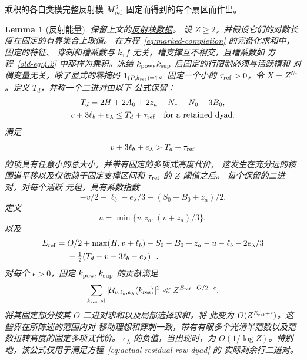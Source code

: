 \documentclass[11pt,a4paper]{article}
\numberwithin{equation}{section}
\numberwithin{figure}{section}
\newtheorem{lemma}[theorem]{Lemma}
\theoremstyle{definition}
\theoremstyle{remark}
\begin{document}
乘积的各自类模完整反射模 \(M_{\rm ref}^2\) 固定而得到的每个扇区而作出。\begin{lemma}[反射能量]\label{lem:reflected-energy}
保留上文的\hyperref[par:reflected-energy-data]{反射块数据}。
设 \(Z\ge2\)，并假设它们的对数长度在固定的有界集合上取值。
在方程~\eqref{eq:marked-completion} 的完备化求和中，固定的特征、
穿刺和槽系数与 \(k,f\) 无关，槽支撑互不相交，且槽系数如
方程~\eqref{old-eq:4.2} 中那样为乘积。冻结
\(k_{\rm pow},k_{\rm sup}\) 后固定的行限制必须与活跃槽和
对偶变量无关，除了显式的零掩码
\(1_{(P,k_{\rm res})=1}\)。固定一个小的 \(\tau_{\rm ref}>0\)，令
\(X=Z^{N_*}\)。定义 \(T_d\)，并称一个二进对由以下
公式保留：
\begin{equation}\label{old-eq:4.4}
 \begin{gathered}
 T_d=2H+2A_0+2z_a-N_*-N_0-3B_0,\\
 v+3\ell_b+e_\lambda\le T_d+\tau_{\rm ref}
 \quad\text{for a retained dyad}.
 \end{gathered}
\end{equation}
满足
\[
 v+3\ell_b+e_\lambda>T_d+\tau_{\rm ref}
\]
的项具有任意小的总大小，并带有固定的多项式高度代价，
这发生在充分远的核围道平移以及仅依赖于固定支撑区间和 \(\tau_{\rm ref}\) 的
\(Z\) 阈值之后。
每个保留的二进对，对每个活跃
元组，具有系数指数
\begin{equation}\label{old-eq:4.5}
 -v/2-\ell_b-e_\lambda/3-(S_0+B_0+z_a)/2.
\end{equation}
定义
\begin{equation}\label{old-eq:4.7}
 u=\min\{v,z_a,(v+z_a)/3\},
\end{equation}
以及
\begin{equation}\label{old-eq:4.6}
 \begin{split}
 E_{\rm ref}={}&O/2+\max(H,v+\ell_b)-S_0-B_0+z_a-u-\ell_b
                     -2e_\lambda/3\\
 &-\tfrac12(T_d-v-3\ell_b-e_\lambda)_+.
 \end{split}
\end{equation}
对每个 \(\epsilon>0\)，固定
\(k_{\rm pow},k_{\rm sup}\) 的贡献满足
\[
 \sum_{k_{\rm res}\ {\rm sf}}
       |\mathcal U_{v,\ell_b,e_\lambda}(k_{\rm res})|^2
 \ll Z^{E_{\rm ref}-O/2+\epsilon}.
\]
将其固定部分按其 \(O\)-二进对求和以及局部选择求和，将
此变为 \(O(Z^{E_{\rm ref}+\epsilon})\)。这些界在所陈述的范围内对
移动理想和穿刺一致，带有有限多个光滑半范数以及范数扭转高度的固定多项式代价。
\(e_\lambda\) 的负值，当出现时，为
\(O(1/\log Z)\)。特别地，该公式仅用于满足方程~\eqref{eq:actual-residual-row-dyad} 的
实际剩余行二进对。
\end{lemma}
\end{document}
